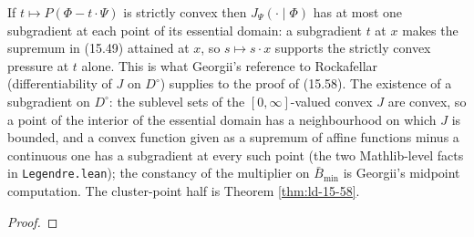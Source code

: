 \begin{proposition}
    \label{prop:ld-15-58-subgradient}
    \leanok

    If $t \mapsto P(\Phi - t\cdot\Psi)$ is strictly convex then $J_\Psi(\cdot\mid\Phi)$ has at most
    one subgradient at each point of its essential domain: a subgradient $t$ at $x$ makes the
    supremum in (15.49) attained at $x$, so $s \mapsto s\cdot x$ supports the strictly convex
    pressure at $t$ alone. This is what Georgii's reference to Rockafellar (differentiability of
    $J$ on $D^\circ$) supplies to the proof of (15.58). The existence of a subgradient on $D^\circ$:
    the sublevel sets of the $[0,\infty]$-valued convex $J$ are convex, so a point of the interior
    of the essential domain has a neighbourhood on which $J$ is bounded, and a convex function
    given as a supremum of affine functions minus a continuous one has a subgradient at every such
    point (the two Mathlib-level facts in \texttt{Legendre.lean}); the constancy of the multiplier
    on $\bar B_{\min}$ is Georgii's midpoint computation. The cluster-point half is Theorem
    \ref{thm:ld-15-58}.
\end{proposition}
\begin{proof}
    \leanok
\end{proof}

